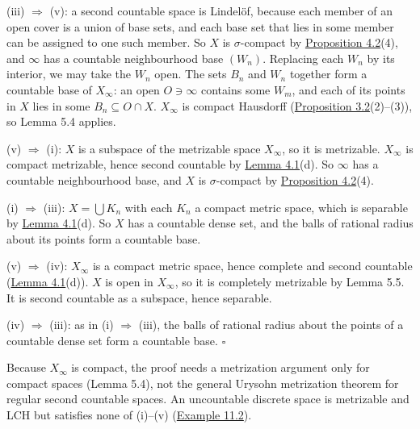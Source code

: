 \documentclass[
  english,
  11pt,
  a4paper,
]{article}
\newcounter{none} %
\begin{document}
(iii) \(\Rightarrow\) (v): a second countable space is Lindelöf, because
each member of an open cover is a union of base sets, and each base set
that lies in some member can be assigned to one such member. So \(X\) is
\(\sigma\)-compact by
\hyperlink{the-stone-weierstrass-theorem-for-functions-vanishing-at-infinity--oa-fnd-sw-15}{Proposition
4.2}(4), and \(\infty\) has a countable neighbourhood base \((W_n)\).
Replacing each \(W_n\) by its interior, we may take the \(W_n\) open.
The sets \(B_n\) and \(W_n\) together form a countable base of
\(X_\infty\): an open \(O\ni\infty\) contains some \(W_m\), and each of
its points in \(X\) lies in some \(B_n\subseteq O\cap X\). \(X_\infty\)
is compact Hausdorff
(\hyperlink{the-stone-weierstrass-theorem-for-functions-vanishing-at-infinity--oa-fnd-sw-02}{Proposition
3.2}(2)--(3)), so Lemma 5.4 applies.

(v) \(\Rightarrow\) (i): \(X\) is a subspace of the metrizable space
\(X_\infty\), so it is metrizable. \(X_\infty\) is compact metrizable,
hence second countable by
\hyperlink{the-stone-weierstrass-theorem-for-functions-vanishing-at-infinity--oa-fnd-sw-15}{Lemma
4.1}(d). So \(\infty\) has a countable neighbourhood base, and \(X\) is
\(\sigma\)-compact by
\hyperlink{the-stone-weierstrass-theorem-for-functions-vanishing-at-infinity--oa-fnd-sw-15}{Proposition
4.2}(4).

(i) \(\Rightarrow\) (iii): \(X=\bigcup K_n\) with each \(K_n\) a compact
metric space, which is separable by
\hyperlink{the-stone-weierstrass-theorem-for-functions-vanishing-at-infinity--oa-fnd-sw-15}{Lemma
4.1}(d). So \(X\) has a countable dense set, and the balls of rational
radius about its points form a countable base.

(v) \(\Rightarrow\) (iv): \(X_\infty\) is a compact metric space, hence
complete and second countable
(\hyperlink{the-stone-weierstrass-theorem-for-functions-vanishing-at-infinity--oa-fnd-sw-15}{Lemma
4.1}(d)). \(X\) is open in \(X_\infty\), so it is completely metrizable
by Lemma 5.5. It is second countable as a subspace, hence separable.

(iv) \(\Rightarrow\) (iii): as in (i) \(\Rightarrow\) (iii), the balls
of rational radius about the points of a countable dense set form a
countable base. \(\square\)

Because \(X_\infty\) is compact, the proof needs a metrization argument
only for compact spaces (Lemma 5.4), not the general Urysohn metrization
theorem for regular second countable spaces. An uncountable discrete
space is metrizable and LCH but satisfies none of (i)--(v)
(\hyperlink{the-stone-weierstrass-theorem-for-functions-vanishing-at-infinity--oa-fnd-sw-13}{Example
11.2}).
\end{document}
